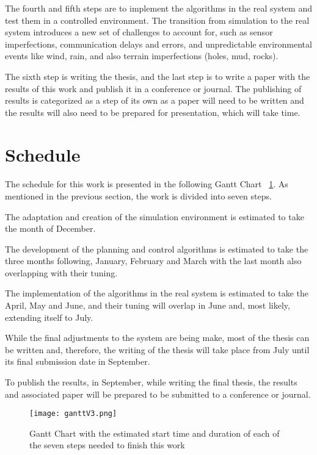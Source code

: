 The fourth and fifth steps are to implement the algorithms in the real system and test them in a controlled environment. The  
transition from simulation to the real system introduces a new set of challenges to account for, such as sensor imperfections, 
communication delays and errors, and unpredictable environmental events like wind, rain, and also terrain imperfections 
(holes, mud, rocks).

The sixth step is writing the thesis, and the last step is to write a paper with the results of this work and 
publish it in a conference or journal. The publishing of results is categorized as a step of its own as a paper 
will need to be written and the results will also need to be prepared for presentation, which will take time.
\clearpage

\section{Schedule}
\label{sec:schedule}
\paragraph{}The schedule for this work is presented in the following Gantt Chart ~\ref{fig:schedule}. 
As mentioned in the previous section, the work is divided into seven steps. 

The adaptation and creation of the simulation environment is estimated to take the month of December. 

The development of the planning and control algorithms is estimated to take the 
three months following, January, February and March with the last month also overlapping with their tuning. 

The implementation of the algorithms in the real system is estimated to take the April, 
May and June, and their tuning will overlap in June and, most likely, extending itself to July. 

While the final adjustments to the system are being make, most of the thesis can be written and, therefore, 
the writing of the thesis will take place from July until its final submission date in September. 

To publish the results, in September, while writing the final thesis, the results and associated paper 
will be prepared to be submitted to a conference or journal. 
\begin{figure}[h]
    \centering
    \texttt{[image: ganttV3.png]}
    \caption{Gantt Chart with the estimated start time and duration of each of the seven steps needed to finish this work}
    \label{fig:schedule}
\end{figure}

